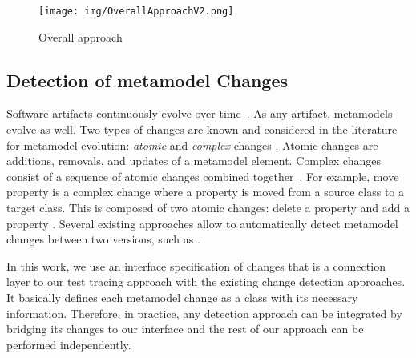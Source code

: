 \begin{figure*}[tb]
\centering
\texttt{[image: img/OverallApproachV2.png]}
\caption{Overall approach}
\label{fig:appraoch}
\end{figure*}


\subsection{Detection of metamodel Changes}\label{sec:changes}


Software artifacts continuously evolve over time~\cite{mens2008introduction}.
As any artifact, metamodels evolve as well.  
Two types of changes are known and considered in the literature for metamodel evolution: \emph{atomic} and \emph{complex} changes \cite{Herrmannsdoerfer2011}. 
Atomic changes are additions, removals, and updates of a metamodel element. Complex changes consist of a sequence of atomic changes combined together~\cite{vermolen_reconstructing_2012,khelladi2015detecting}. For example, move property is a complex change where a property is moved from a source class to a target class. This is composed of two atomic changes: delete a property and add a property \cite{Herrmannsdoerfer2011}. 
Several existing approaches allow to automatically detect metamodel changes between two versions, such as \cite{Alter2015, williams2012searching,cicchetti_managing_2009,langer_posteriori_2013,vermolen_reconstructing_2012,Khelladi2016}.

In this work, we use an interface specification of changes {\small{}} that is a connection layer to our test tracing approach with the existing change detection approaches. It basically defines each metamodel change as a class with its necessary information. Therefore, in practice, any detection approach \cite{Alter2015, williams2012searching,cicchetti_managing_2009,langer_posteriori_2013,vermolen_reconstructing_2012,Khelladi2016} can be integrated by bridging its changes to our interface and the rest of our approach can be performed independently. 

